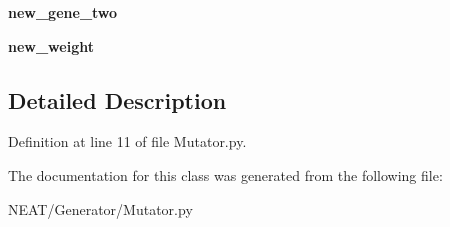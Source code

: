 \begin{DoxyCompactItemize}
\item 
{\bfseries new\+\_\+gene\+\_\+two}\hypertarget{class_n_e_a_t___py_genetics_1_1_n_e_a_t_1_1_generator_1_1_mutator_1_1_mutator_a3380ad2d05e8eace2063d8f1791274e0}{}\label{class_n_e_a_t___py_genetics_1_1_n_e_a_t_1_1_generator_1_1_mutator_1_1_mutator_a3380ad2d05e8eace2063d8f1791274e0}

\item 
{\bfseries new\+\_\+weight}\hypertarget{class_n_e_a_t___py_genetics_1_1_n_e_a_t_1_1_generator_1_1_mutator_1_1_mutator_a21e659d59a5f4ac929795dc4f5036f44}{}\label{class_n_e_a_t___py_genetics_1_1_n_e_a_t_1_1_generator_1_1_mutator_1_1_mutator_a21e659d59a5f4ac929795dc4f5036f44}

\end{DoxyCompactItemize}


\subsection{Detailed Description}


Definition at line 11 of file Mutator.\+py.



The documentation for this class was generated from the following file\+:\begin{DoxyCompactItemize}
\item 
N\+E\+A\+T/\+Generator/Mutator.\+py\end{DoxyCompactItemize}
